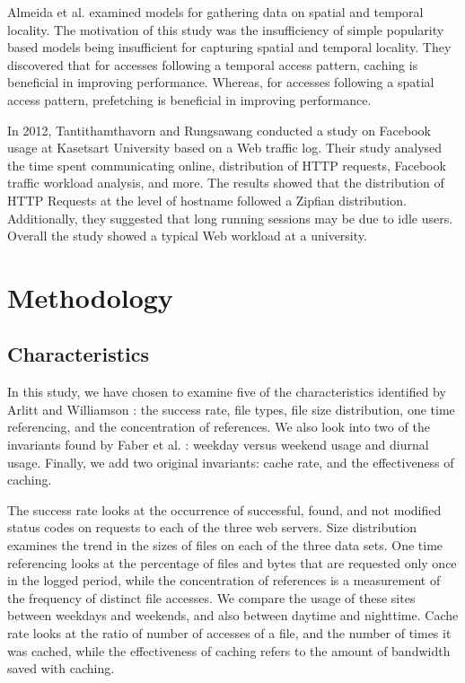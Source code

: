 \documentclass[10pt,conference]{IEEEtran}
\begin{document}
Almeida et al. \cite{reference_locality} examined models for gathering data on spatial and temporal locality. The motivation of this study was the insufficiency of simple popularity based models being insufficient for capturing spatial and temporal locality. They discovered that for accesses following a temporal access pattern, caching is beneficial in improving performance. Whereas, for accesses following a spatial access pattern, prefetching is beneficial in improving performance.

In 2012, Tantithamthavorn and Rungsawang \cite{facebook} conducted a study on Facebook usage at Kasetsart University based on a Web traffic log. Their study analysed the time spent communicating online, distribution of HTTP requests, Facebook traffic workload analysis, and more. The results showed that the distribution of HTTP Requests at the level of hostname followed a Zipfian distribution. Additionally, they suggested that long running sessions may be due to idle users. Overall the study showed a typical Web workload at a university.

\section{Methodology}\label{methodology}
\subsection{Characteristics}\label{lab:characteristics}
In this study, we have chosen to examine five of the characteristics identified by Arlitt and Williamson \cite{keynote}: the success rate, file types, file size distribution, one time referencing, and the concentration of references. We also look into two of the invariants found by Faber et al. \cite{Faber}: weekday versus weekend usage and diurnal usage. Finally, we add two original invariants: cache rate, and the effectiveness of caching.

The success rate looks at the occurrence of successful, found, and not modified status codes on requests to each of the three web servers. Size distribution examines the trend in the sizes of files on each of the three data sets. One time referencing looks at the percentage of files and bytes that are requested only once in the logged period, while the concentration of references is a measurement of the frequency of distinct file accesses. We compare the usage of these sites between weekdays and weekends, and also between daytime and nighttime. Cache rate looks at the ratio of number of accesses of a file, and the number of times it was cached, while the effectiveness of caching refers to the amount of bandwidth saved with caching.
\end{document}
